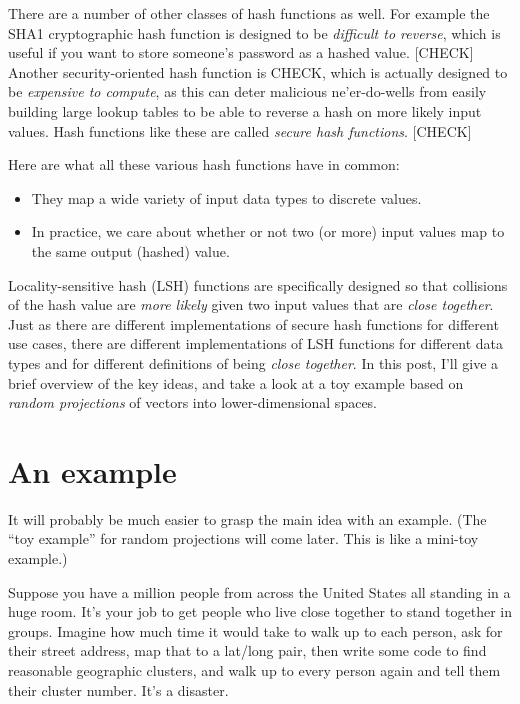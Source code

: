 \documentclass[20pt,]{extarticle}
\providecommand{\tightlist}{%
  \setlength{\itemsep}{0pt}\setlength{\parskip}{0pt}}
\begin{document}
There are a number of other classes of hash functions as well. For
example the SHA1 cryptographic hash function is designed to be
\emph{difficult to reverse}, which is useful if you want to store
someone's password as a hashed value. {[}CHECK{]} Another
security-oriented hash function is CHECK, which is actually designed to
be \emph{expensive to compute}, as this can deter malicious
ne'er-do-wells from easily building large lookup tables to be able to
reverse a hash on more likely input values. Hash functions like these
are called \emph{secure hash functions}. {[}CHECK{]}

Here are what all these various hash functions have in common:

\begin{itemize}
\tightlist
\item
  They map a wide variety of input data types to discrete values.
\item
  In practice, we care about whether or not two (or more) input values
  map to the same output (hashed) value.
\end{itemize}

Locality-sensitive hash (LSH) functions are specifically designed so
that collisions of the hash value are \emph{more likely} given two input
values that are \emph{close together}. Just as there are different
implementations of secure hash functions for different use cases, there
are different implementations of LSH functions for different data types
and for different definitions of being \emph{close together}. In this
post, I'll give a brief overview of the key ideas, and take a look at a
toy example based on \emph{random projections} of vectors into
lower-dimensional spaces.

\section{An example}\label{an-example}

It will probably be much easier to grasp the main idea with an example.
(The ``toy example'' for random projections will come later. This is
like a mini-toy example.)

Suppose you have a million people from across the United States all
standing in a huge room. It's your job to get people who live close
together to stand together in groups. Imagine how much time it would
take to walk up to each person, ask for their street address, map that
to a lat/long pair, then write some code to find reasonable geographic
clusters, and walk up to every person again and tell them their cluster
number. It's a disaster.
\end{document}
